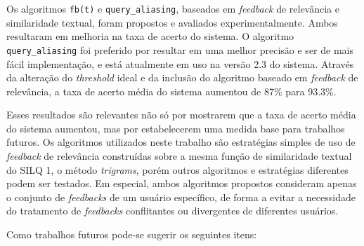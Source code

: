 \documentclass[12pt]{article}
\begin{document}
Os algoritmos \texttt{fb(t)} e \texttt{query\_aliasing}, baseados em \textit{feedback} de relevância e similaridade textual, foram propostos e avaliados experimentalmente. Ambos resultaram em melhoria na taxa de acerto do sistema. O algoritmo \texttt{query\_aliasing} foi preferido por resultar em uma melhor precisão e ser de mais fácil implementação, e está atualmente em uso na versão 2.3 do sistema. Através da alteração do \textit{threshold} ideal e da inclusão do algoritmo baseado em \textit{feedback} de relevância, a taxa de acerto média do sistema aumentou de 87\% para 93.3\%.

Esses resultados são relevantes não só por mostrarem que a taxa de acerto média do sistema aumentou, mas por estabelecerem uma medida base para trabalhos futuros. Os algoritmos utilizados neste trabalho são estratégias simples de uso de \textit{feedback} de relevância construídas sobre a mesma função de similaridade textual do SILQ 1, o método \textit{trigrams}, porém outros algoritmos e estratégias diferentes podem ser testados. Em especial, ambos algoritmos propostos consideram apenas o conjunto de \textit{feedbacks} de um usuário específico, de forma a evitar a necessidade do tratamento de \textit{feedbacks} conflitantes ou divergentes de diferentes usuários.

Como trabalhos futuros pode-se sugerir os seguintes itens:
\end{document}
